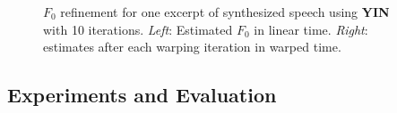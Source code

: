\begin{figure}[t]
\centering
{}
\caption{$F_0$ refinement for one excerpt of synthesized speech using \textbf{YIN}~\cite{decheveigne02} with 10 iterations. \emph{Left}: Estimated $F_0$ in linear time. \emph{Right}: estimates after each warping iteration in warped time.}
\label{fig:teaser_refined}
\end{figure}

\subsection{Experiments and Evaluation} %
\label{sec:experiments}

